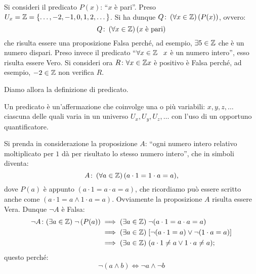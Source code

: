 \begin{example}
    Si consideri il predicato \(P(x)\): ``\(x\) è pari''. Preso \(U_x = \mathbb{Z} = \{\dotsc, -2,-1,0,1,2, \dotsc\}\). Si ha dunque \(Q\colon \left(\forall x \in \mathbb{Z}\right)(P(x))\), ovvero:
    \[
        Q\colon \left(\forall x \in \mathbb{Z}\right) (x \text{ è pari})
    \]
    che risulta essere una proposizione Falsa perché, ad esempio, \(\exists 5 \in \mathbb{Z}\) che è un numero dispari.
    Preso invece il predicato ``\(\forall x \in \mathbb{Z}\;\;\; x\) è un numero intero'', esso risulta essere Vero.
    Si consideri ora \(R\colon \forall x \in \mathbb{Z} x \) è positivo è Falsa perché, ad esempio, \(-2 \in \mathbb{Z}\) non verifica \(R\).
\end{example}

\noindent Diamo allora la definizione di predicato.
\begin{definition}[predicato]\label{def:predicato}
    Un predicato è un'affermazione che coinvolge una o più variabili: \(x,y,z, \dotsc\) ciascuna delle quali varia in un universo \(U_x,U_y,U_z, \dotsc\) con l'uso di un opportuno quantificatore.
\end{definition}

\begin{example}
    Si prenda in considerazione la proposizione \(A\): ``ogni numero intero relativo moltiplicato per \(1\) dà per risultato lo stesso numero intero'', che in simboli diventa:
    \[
        A\colon \left(\forall a \in \mathbb{Z}\right)(a \cdot 1 = 1 \cdot a = a),
    \]
    dove \(P(a)\) è appunto \((a \cdot 1 = a \cdot a = a)\), che ricordiamo può essere scritto anche come \((a \cdot 1 = a \land 1 \cdot a = a)\). Ovviamente la proposizione \(A\) risulta essere Vera. Dunque \(\neg A\) è Falsa:
    \begin{alignat*}{1}
        \neg A\colon (\exists a \in \Z)\; \neg \left(P(a)\right)%
            &\implies (\exists a \in \Z)\; \neg (a \cdot 1 = a \cdot a = a) \\
            &\implies (\exists a \in \Z)\; [\neg (a \cdot 1 = a) \lor \neg (1 \cdot a = a)] \\
            &\implies (\exists a \in \Z)\; (a \cdot 1 \neq a \lor 1 \cdot a \neq a);
    \end{alignat*}
    questo perché:
    \[
        \neg (a \land b) \iff \neg a \land \neg b
    \]
\end{example}

